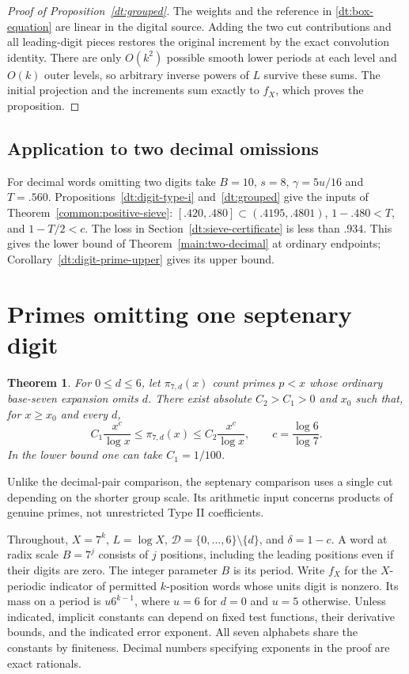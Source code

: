 \documentclass[11pt,a4paper]{article}
\theoremstyle{paperplain}
\newtheorem{theorem}{Theorem}[section]
\numberwithin{equation}{section}
\begin{document}
\begin{proof}[Proof of Proposition~\ref{dt:grouped}]
The weights and the reference in \eqref{dt:box-equation} are linear
in the digital source. Adding the two cut contributions and all
leading-digit pieces restores the original increment by the exact
convolution identity. There are only \(O(k^2)\) possible smooth
lower periods at each level and \(O(k)\) outer levels, so arbitrary
inverse powers of \(L\) survive these sums. The initial projection
and the increments sum exactly to \(f_X\), which proves the proposition.
\end{proof}

\subsection{Application to two decimal omissions}
For decimal words omitting two digits take $B=10$, $s=8$,
$\gamma=5u/16$ and $T=.560$. Propositions~\ref{dt:digit-type-i}
and~\ref{dt:grouped} give the inputs of Theorem~\ref{common:positive-sieve}:
$[.420,.480]\subset(.4195,.4801)$, $1-.480<T$, and $1-T/2<c$.
The loss in Section~\ref{dt:sieve-certificate} is less than $.934$.
This gives the lower bound of Theorem~\ref{main:two-decimal} at
ordinary endpoints; Corollary~\ref{dt:digit-prime-upper} gives its upper bound.

\clearpage

\section{Primes omitting one septenary digit}\label{sec:seven}
\begin{theorem}\label{seven:main}
For $0\le d\le6$, let $\pi_{7,d}(x)$ count primes $p<x$ whose
ordinary base-seven expansion omits $d$. There exist absolute
$C_2>C_1>0$ and $x_0$ such that, for $x\ge x_0$ and every $d$,
\[
 C_1\frac{x^c}{\log x}\le \pi_{7,d}(x)\le C_2\frac{x^c}{\log x},
 \qquad c=\frac{\log6}{\log7}.
\]
In the lower bound one can take $C_1=1/100$.
\end{theorem}

Unlike the decimal-pair comparison, the septenary comparison uses a single
cut depending on the shorter group scale. Its arithmetic input concerns
products of genuine primes, not unrestricted Type II coefficients.

Throughout, $X=7^k$, $L=\log X$, $\mathcal D=\{0,\ldots,6\}\setminus
\{d\}$, and $\delta=1-c$. A word at radix scale $B=7^j$ consists
of $j$ positions, including the leading positions even if their
digits are zero. The integer parameter $B$ is its period. Write
$f_X$ for the $X$-periodic indicator of permitted $k$-position
words whose units digit is nonzero. Its mass on a period is
$u6^{k-1}$, where $u=6$ for $d=0$ and $u=5$ otherwise. Unless
indicated, implicit constants can depend on fixed test functions,
their derivative bounds, and the indicated error exponent. All
seven alphabets share the constants by finiteness. Decimal
numbers specifying exponents in the proof are exact rationals.
\end{document}
